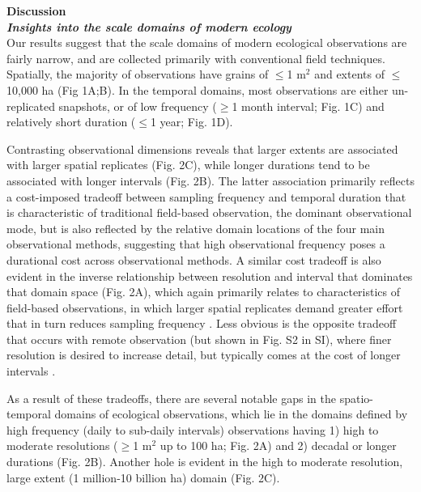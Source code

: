 \documentclass[12pt]{article}
\begin{document}
\noindent \textbf{Discussion}\\
\noindent \textbf{\emph{Insights into the scale domains of modern ecology}}\\
Our results suggest that the scale domains of modern ecological observations are fairly narrow, and are collected primarily with conventional field techniques. Spatially, the majority of observations have grains of $\leq$1 m$^2$ and extents of $\leq$10,000 ha (Fig 1A;B). In the temporal domains, most observations are either un-replicated snapshots, or of low frequency ($\geq$1 month interval; Fig. 1C) and relatively short duration ($\leq$1 year; Fig. 1D). 

Contrasting observational dimensions reveals that larger extents are associated with larger spatial replicates (Fig. 2C), while longer durations tend to be associated with longer intervals (Fig. 2B). The latter association primarily reflects a cost-imposed tradeoff between sampling frequency and temporal duration that is characteristic of traditional field-based observation, the dominant observational mode, but is also reflected by the relative domain locations of the four main observational methods, suggesting that high observational frequency poses a durational cost across observational methods. A similar cost tradeoff is also evident in the inverse relationship between resolution and interval that dominates that domain space (Fig. 2A), which again primarily relates to characteristics of field-based observations, in which larger spatial replicates demand greater effort that in turn reduces sampling frequency \cite{kareiva_spatial_1988}. Less obvious is the opposite tradeoff that occurs with remote observation (but shown in Fig. S2 in SI), where finer resolution is desired to increase detail, but typically comes at the cost of longer intervals \cite{estes_platform_2016}.   

As a result of these tradeoffs, there are several notable gaps in the spatio-temporal domains of ecological observations, which lie in the domains defined by high frequency (daily to sub-daily intervals) observations having 1) high to moderate resolutions ($\geq$1 m$^2$ up to 100 ha; Fig. 2A) and 2) decadal or longer durations (Fig. 2B).  Another hole is evident in the high to moderate resolution, large extent (1 million-10 billion ha) domain (Fig. 2C). 
\end{document}
